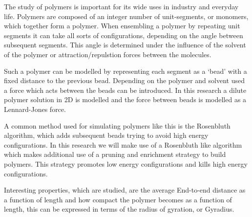The study of polymers is important for its wide uses in industry and everyday life. Polymers are composed of an integer number of unit-segments, or monomers, which together form a polymer. When ensembling a polymer by repeating unit segments it can take all sorts of configurations, depending on the angle between subsequent segments. This angle is determined under the influence of the solvent of the polymer or attraction/repulstion forces between the molecules. 

Such a polymer can be modelled by representing each segment as a `bead' with a fixed distance to the previous bead. Depending on the polymer and solvent used a force which acts between the beads can be introduced. In this research a dilute polymer solution in 2D is modelled and the force between beads is modelled as a Lennard-Jones force.

A common method used for simulating polymers like this is the Rosenbluth algorithm, which adds subsequent beads trying to avoid high energy configurations. In this research we will make use of a Rosenbluth like algorithm which makes additional use of a pruning and enrichment strategy to build polymers. This strategy promotes low energy configurations and kills high energy configurations. 

Interesting properties, which are studied, are the average End-to-end distance as a function of length and how compact the polymer becomes as a function of length, this can be expressed in terms of the radius of gyration, or Gyradius.  